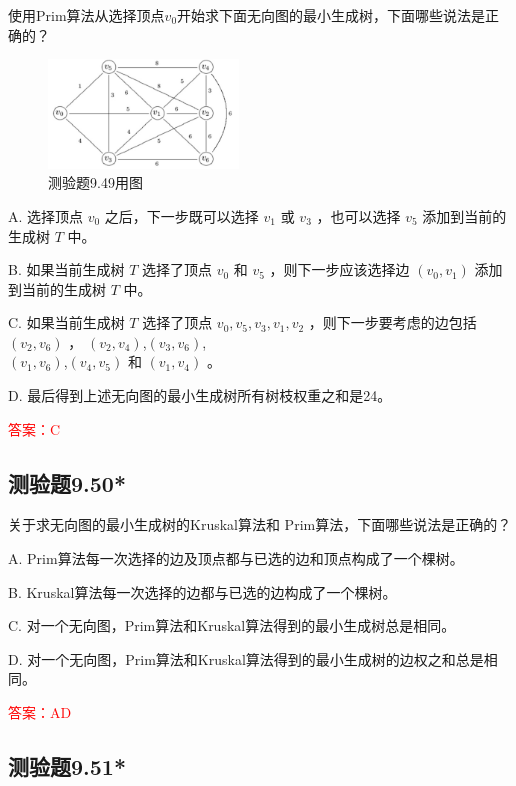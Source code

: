 \documentclass[UTF8, heading=true]{ctexart}
\begin{document}
使用Prim算法从选择顶点$v_0$开始求下面无向图的最小生成树，下面哪些说法是正确的？

\begin{figure}[H]
  \centering
  \includegraphics[width=0.45\textwidth]{9.48.jpg} %
  \caption{测验题9.49用图}
\end{figure}

A. 
选择顶点 $v_0$ 之后，下一步既可以选择 $v_1$ 或 $v_3$ ，也可以选择 $v_5$ 添加到当前的生成树 $T$ 中。

B. 
如果当前生成树 $T$ 选择了顶点 $v_0$ 和 $v_5$ ，则下一步应该选择边 $\left(v_0, v_1\right)$ 添加到当前的生成树 $T$ 中。

C. 
如果当前生成树 $T$ 选择了顶点 $v_0, v_5, v_3, v_1, v_2$ ，则下一步要考虑的边包括 $\left(v_2, v_6\right)$ ， $\left(v_2, v_4\right)$,$\left(v_3, v_6\right)$,\\$\left(v_1, v_6\right)$,$\left(v_4, v_5\right)$ 和 $\left(v_1, v_4\right)$ 。

D. 
最后得到上述无向图的最小生成树所有树枝权重之和是24。

\textcolor{red}{答案：C}

\subsection{测验题9.50*}

关于求无向图的最小生成树的Kruskal算法和
Prim算法，下面哪些说法是正确的？

A. Prim算法每一次选择的边及顶点都与已选的边和顶点构成了一个棵树。

B. Kruskal算法每一次选择的边都与已选的边构成了一个棵树。

C. 对一个无向图，Prim算法和Kruskal算法得到的最小生成树总是相同。

D. 
对一个无向图，Prim算法和Kruskal算法得到的最小生成树的边权之和总是相同。

\textcolor{red}{答案：AD}

\subsection{测验题9.51*}
\end{document}

